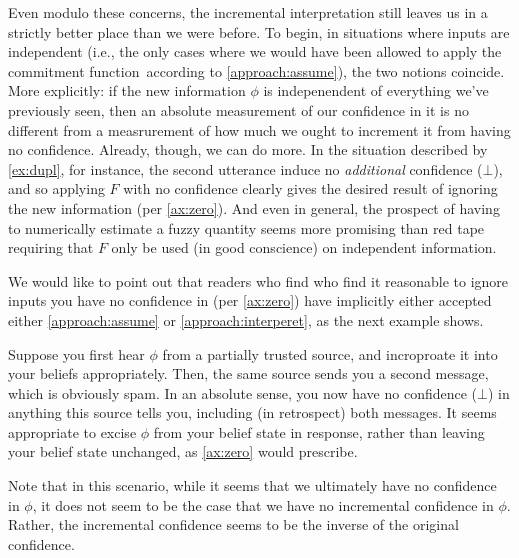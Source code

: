 \begin{subappendices}
\begin{enumerate}[label={\textbf{I\arabic*.}},ref={I\arabic*}]
    	Even modulo these concerns, the incremental interpretation still leaves us in a strictly better place than we were before.
    	To begin, in situations where inputs are independent (i.e., the only cases where we would have been allowed to apply the commitment function\ according to \cref{approach:assume}), the two notions coincide.
    	More explicitly: if the new information $\phi$ is indepenendent of everything we've previously seen, then an absolute measurement of our confidence in it is no different from a measrurement of how much we ought to increment it from having no confidence.
    	Already, though, we can do more.
    	In the situation described by \cref{ex:dupl}, for instance,
    	the second utterance induce no \emph{additional} confidence ($\bot$), and so applying $F$ with no confidence clearly gives the desired result of ignoring the new information (per \cref{ax:zero}).
    	And even in general, the prospect of having to numerically estimate a fuzzy quantity seems more promising than red tape requiring that $F$ only be used (in good conscience) on independent information.

    \end{enumerate}

    We would like to point out that readers who find who find it reasonable to ignore inputs you have no confidence in (per \cref{ax:zero}) have implicitly either accepted either \cref{approach:assume} or \cref{approach:interperet}, as the next example shows. 


    \begin{example}
    	Suppose you first hear $\phi$ from a partially trusted source, and incroproate it into your beliefs appropriately.
    	Then, the same source sends you a second message, which is obviously spam.
    	In an absolute sense, you now have no confidence ($\bot$) in anything this source tells you, including (in retrospect) both messages.
    	It seems appropriate to excise $\phi$ from your belief state in response, rather than leaving your belief state unchanged, as \cref{ax:zero} would prescribe.

    	Note that in this scenario, while it seems that we ultimately have no confidence in $\phi$, it does not seem to be the case that we have no incremental confidence in $\phi$.
    	Rather, the incremental confidence seems to be the inverse of the original confidence.
    \end{example}


\end{subappendices}
